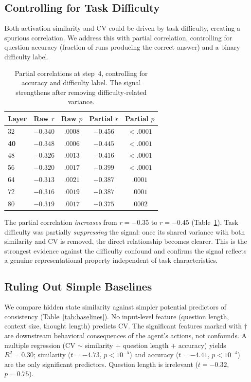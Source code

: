 \documentclass{article}
\begin{document}
\subsection{Controlling for Task Difficulty}

Both activation similarity and CV could be driven by task difficulty, creating a spurious correlation. We address this with partial correlation, controlling for question accuracy (fraction of runs producing the correct answer) and a binary difficulty label.

\begin{table}[t]
\caption{Partial correlations at step~4, controlling for accuracy and difficulty label. The signal strengthens after removing difficulty-related variance.}
\label{tab:partial}
\centering
\small
\begin{tabular}{lcccc}
\toprule
Layer & Raw $r$ & Raw $p$ & Partial $r$ & Partial $p$ \\
\midrule
32 & $-0.340$ & $.0008$ & $-0.456$ & $< .0001$ \\
\textbf{40} & $\mathbf{-0.348}$ & $\mathbf{.0006}$ & $\mathbf{-0.445}$ & $\mathbf{< .0001}$ \\
48 & $-0.326$ & $.0013$ & $-0.416$ & $< .0001$ \\
56 & $-0.320$ & $.0017$ & $-0.399$ & $< .0001$ \\
64 & $-0.313$ & $.0021$ & $-0.387$ & $.0001$ \\
72 & $-0.316$ & $.0019$ & $-0.387$ & $.0001$ \\
80 & $-0.319$ & $.0017$ & $-0.375$ & $.0002$ \\
\bottomrule
\end{tabular}
\end{table}

The partial correlation \emph{increases} from $r = -0.35$ to $r = -0.45$ (Table~\ref{tab:partial}). Task difficulty was partially \emph{suppressing} the signal: once its shared variance with both similarity and CV is removed, the direct relationship becomes clearer. This is the strongest evidence against the difficulty confound and confirms the signal reflects a genuine representational property independent of task characteristics.

\subsection{Ruling Out Simple Baselines}

We compare hidden state similarity against simpler potential predictors of consistency (Table~\ref{tab:baselines}). No input-level feature (question length, context size, thought length) predicts CV. The significant features marked with $\dagger$ are downstream behavioral consequences of the agent's actions, not confounds. A multiple regression (CV $\sim$ similarity + question length + accuracy) yields $R^2 = 0.30$; similarity ($t = -4.73$, $p < 10^{-5}$) and accuracy ($t = -4.41$, $p < 10^{-4}$) are the only significant predictors. Question length is irrelevant ($t = -0.32$, $p = 0.75$).
\end{document}
